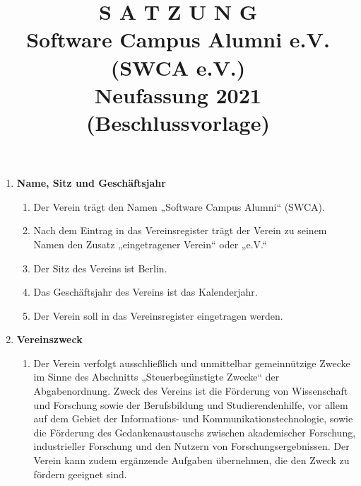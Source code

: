 \documentclass{article}
\title{\textsf{\textbf{S A T Z U N G}}\\
\small\textbf{Software Campus Alumni e.V. (SWCA e.V.)}\\
Neufassung 2021 (Beschlussvorlage)}
\author{}
\date{}
\begin{document}
\maketitle

\begin{enumerate}[§ 1.]

\item \textsf{\textbf{Name, Sitz und Geschäftsjahr}}
	\begin{enumerate}[1.]
	\item Der Verein trägt den Namen „Software Campus Alumni“ (SWCA).
	\item Nach dem Eintrag in das Vereinsregister trägt der Verein zu seinem Namen den Zusatz „eingetragener Verein“ oder „e.V.“
	\item Der Sitz des Vereins ist Berlin.
	\item Das Geschäftsjahr des Vereins ist das Kalenderjahr.
	\item Der Verein soll in das Vereinsregister eingetragen werden.
	\end{enumerate}

\item \textsf{\textbf{Vereinszweck}}
	\begin{enumerate}[1.]
	\item Der Verein verfolgt ausschließlich und unmittelbar gemeinnützige Zwecke im Sinne des Abschnitts „Steuerbegünstigte Zwecke“ der Abgabenordnung.
	Zweck des Vereins ist die Förderung von Wissenschaft und Forschung sowie der Berufsbildung und Studierendenhilfe, vor allem auf dem Gebiet der Informations- und Kommunikationstechnologie, sowie die Förderung des Gedankenaustauschs zwischen akademischer Forschung, industrieller Forschung und den Nutzern von Forschungsergebnissen.
	Der Verein kann zudem ergänzende Aufgaben übernehmen, die den Zweck zu fördern geeignet sind.


\end{enumerate}
\end{enumerate}
\end{document}

